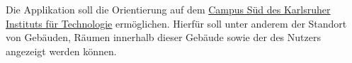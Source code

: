 
Die Applikation soll die Orientierung auf dem \href{https://www.kit.edu/kit/campus_sued_pkw.php}{Campus Süd des Karlsruher Instituts für Technologie}
 ermöglichen. Hierfür soll unter anderem der Standort von Gebäuden, Räumen innerhalb dieser Gebäude sowie der
 des Nutzers angezeigt werden können.
 